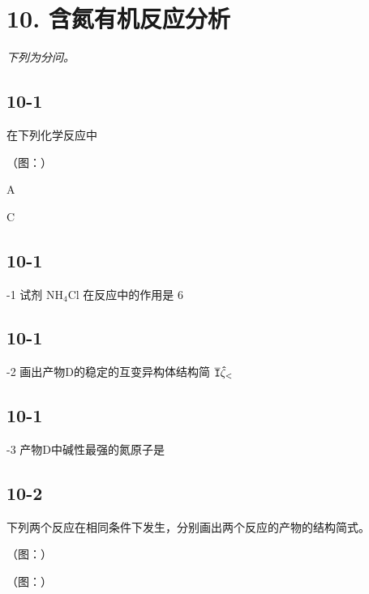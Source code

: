 \section*{10. 含氮有机反应分析}
\textit{下列为分问。}

\subsection*{10-1}
在下列化学反应中

（图：）

A

C

\subsection*{10-1}
-1 试剂 $\mathrm { N H _ { 4 } C l }$ 在反应中的作⽤是 6

\subsection*{10-1}
-2 画出产物D的稳定的互变异构体结构简 $\tt { \overline { { I } } } \hat { \zeta } _ { \mathrm { < } }$

\subsection*{10-1}
-3 产物D中碱性最强的氮原⼦是

\subsection*{10-2}
下列两个反应在相同条件下发⽣，分别画出两个反应的产物的结构简式。

（图：）

（图：）
